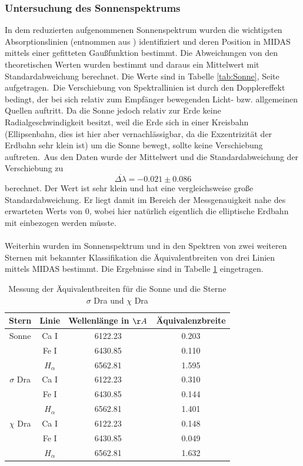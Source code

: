 \subsubsection{Untersuchung des Sonnenspektrums}
In dem reduzierten aufgenommenen Sonnenspektrum wurden die wichtigsten Absorptionslinien (entnommen aus \cite{ronomischesPraktikum}) identifiziert und deren Position in MIDAS mittels einer gefitteten Gaußfunktion bestimmt. Die Abweichungen von den theoretischen Werten wurden bestimmt und daraus ein Mittelwert mit Standardabweichung berechnet. Die Werte sind in Tabelle \ref{tab:Sonne}, Seite \pageref{tab:Sonne} aufgetragen.\
Die Verschiebung von Spektrallinien ist durch den Dopplereffekt bedingt, der bei sich relativ zum Empfänger bewegenden Licht- bzw. allgemeinen Quellen auftritt. Da die Sonne jedoch relativ zur Erde keine Radialgeschwindigkeit besitzt, weil die Erde sich in einer Kreisbahn (Ellipsenbahn, dies ist hier aber vernachlässigbar,  da die Exzentrizität der Erdbahn sehr klein ist) um die Sonne bewegt, sollte keine Verschiebung auftreten.\
Aus den Daten wurde der Mittelwert und die Standardabweichung der Verschiebung zu
\begin{equation}
\overline{\Delta\lambda} = -0.021 \pm 0.086
\end{equation}
berechnet. Der Wert ist sehr klein und hat eine vergleichsweise große Standardabweichung. Er liegt damit im Bereich der Messgenauigkeit nahe des erwarteten Werts von 0, wobei hier natürlich eigentlich die elliptische Erdbahn mit einbezogen werden müsste.
\\
\\
Weiterhin wurden im Sonnenspektrum und in den Spektren von zwei weiteren Sternen mit bekannter Klassifikation die Äquivalentbreiten von drei Linien mittels MIDAS bestimmt. Die Ergebnisse sind in Tabelle \ref{tab:Aequivalentbreite} eingetragen.

\begin{table}
\begin{center}
\begin{tabular}{c|c|c|c}
Stern & Linie & Wellenlänge in $\AA$ & Äquivalenzbreite \\ 
\hline 
Sonne & Ca I & 6122.23 & 0.203 \\ 
& Fe I & 6430.85 & 0.110 \\ 
& $H_\alpha$ & 6562.81 & 1.595 \\ 
\hline
$\sigma$ Dra & Ca I & 6122.23 & 0.310 \\ 
& Fe I & 6430.85 & 0.144 \\  
& $H_\alpha$ & 6562.81 & 1.401 \\ 
\hline
$\chi$ Dra & Ca I & 6122.23 & 0.148 \\ 
& Fe  I & 6430.85 & 0.049 \\ 
& $H_\alpha$ & 6562.81 & 1.632 \\ 
\end{tabular}
\caption{Messung der Äquivalentbreiten für die Sonne und die Sterne $\sigma$ Dra und $\chi$ Dra}
\label{tab:Aequivalentbreite}
\end{center}
\end{table} 

